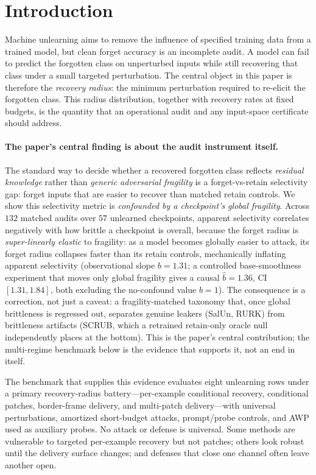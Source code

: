 \documentclass[11pt]{article}
\begin{document}
\section{Introduction}
Machine unlearning aims to remove the influence of specified training data from a trained model, but clean forget accuracy is an incomplete audit. A model can fail to predict the forgotten class on unperturbed inputs while still recovering that class under a small targeted perturbation. The central object in this paper is therefore the \emph{recovery radius}: the minimum perturbation required to re-elicit the forgotten class. This radius distribution, together with recovery rates at fixed budgets, is the quantity that an operational audit and any input-space certificate should address.

\paragraph{The paper's central finding is about the audit instrument itself.} The standard way to decide whether a recovered forgotten class reflects \emph{residual knowledge} rather than \emph{generic adversarial fragility} is a forget-vs-retain selectivity gap: forget inputs that are easier to recover than matched retain controls. We show this selectivity metric is \emph{confounded by a checkpoint's global fragility}. Across $132$ matched audits over $57$ unlearned checkpoints, apparent selectivity correlates negatively with how brittle a checkpoint is overall, because the forget radius is \emph{super-linearly elastic} to fragility: as a model becomes globally easier to attack, its forget radius collapses faster than its retain controls, mechanically inflating apparent selectivity (observational slope $b{=}1.31$; a controlled base-smoothness experiment that moves only global fragility gives a causal $\hat b{=}1.36$, CI $[1.31,1.84]$, both excluding the no-confound value $b{=}1$). The consequence is a correction, not just a caveat: a fragility-matched taxonomy that, once global brittleness is regressed out, separates genuine leakers (SalUn, RURK) from brittleness artifacts (SCRUB, which a retrained retain-only oracle null independently places at the bottom). This is the paper's central contribution; the multi-regime benchmark below is the evidence that supports it, not an end in itself.

The benchmark that supplies this evidence evaluates eight unlearning rows under a primary recovery-radius battery---per-example conditional recovery, conditional patches, border-frame delivery, and multi-patch delivery---with universal perturbations, amortized short-budget attacks, prompt/probe controls, and AWP used as auxiliary probes. No attack or defense is universal. Some methods are vulnerable to targeted per-example recovery but not patches; others look robust until the delivery surface changes; and defenses that close one channel often leave another open.
\end{document}
